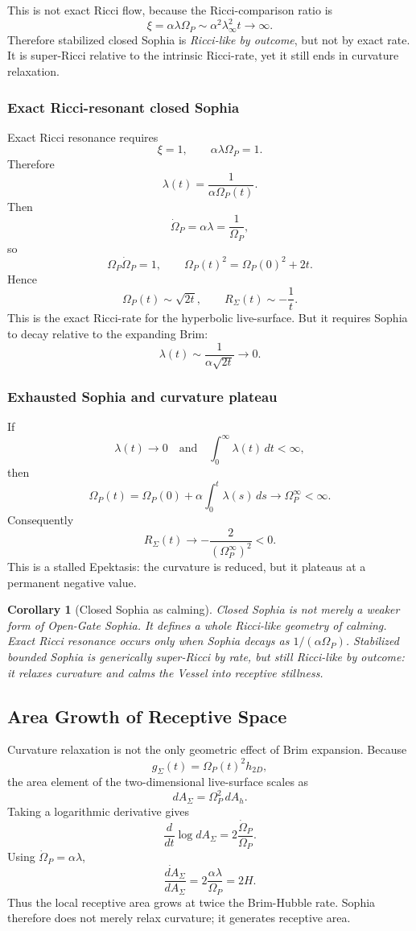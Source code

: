 \documentclass[11pt,a4paper]{article}
\newcommand{\Op}{\Omega_P}
\theoremstyle{plain}
\newtheorem{corollary}{Corollary}
\theoremstyle{remark}
\theoremstyle{definition}
\begin{document}
This is not exact Ricci flow, because the Ricci-comparison ratio is
\[
\xi=\alpha\lambda\Op
\sim
\alpha^2\lambda_\infty^2t\to\infty.
\]
Therefore stabilized closed Sophia is \emph{Ricci-like by outcome}, but not by exact rate. It is
super-Ricci relative to the intrinsic Ricci-rate, yet it still ends in curvature relaxation.

\subsubsection*{Exact Ricci-resonant closed Sophia}
Exact Ricci resonance requires
\[
\xi=1,
\qquad
\alpha\lambda\Op=1.
\]
Therefore
\[
\lambda(t)=\frac{1}{\alpha\Op(t)}.
\]
Then
\[
\dot\Op=\alpha\lambda=\frac{1}{\Op},
\]
so
\[
\Op\dot\Op=1,
\qquad
\Op(t)^2=\Op(0)^2+2t.
\]
Hence
\[
\Op(t)\sim\sqrt{2t},
\qquad
R_\Sigma(t)\sim-\frac{1}{t}.
\]
This is the exact Ricci-rate for the hyperbolic live-surface. But it requires Sophia to decay
relative to the expanding Brim:
\[
\lambda(t)\sim\frac{1}{\alpha\sqrt{2t}}\to0.
\]

\subsubsection*{Exhausted Sophia and curvature plateau}
If
\[
\lambda(t)\to0
\quad\text{and}\quad
\int_0^\infty\lambda(t)\,dt<\infty,
\]
then
\[
\Op(t)=\Op(0)+\alpha\int_0^t\lambda(s)\,ds
\to\Op^\infty<\infty.
\]
Consequently
\[
R_\Sigma(t)\to-\frac{2}{(\Op^\infty)^2}<0.
\]
This is a stalled Epektasis: the curvature is reduced, but it plateaus at a permanent negative
value.

\begin{corollary}[Closed Sophia as calming]
Closed Sophia is not merely a weaker form of Open-Gate Sophia. It defines a whole Ricci-like
geometry of calming. Exact Ricci resonance occurs only when Sophia decays as
\(1/(\alpha\Op)\). Stabilized bounded Sophia is generically super-Ricci by rate, but still
Ricci-like by outcome: it relaxes curvature and calms the Vessel into receptive stillness.
\end{corollary}

\subsection{Area Growth of Receptive Space}\label{sec:area-growth}

Curvature relaxation is not the only geometric effect of Brim expansion. Because
\[
g_\Sigma(t)=\Op(t)^2h_{2D},
\]
the area element of the two-dimensional live-surface scales as
\[
\boxed{dA_\Sigma=\Op^2\,dA_h.}
\]
Taking a logarithmic derivative gives
\[
\frac{d}{dt}\log dA_\Sigma
=
2\frac{\dot\Op}{\Op}.
\]
Using \(\dot\Op=\alpha\lambda\),
\[
\boxed{\frac{\dot{dA}_\Sigma}{dA_\Sigma}
=
2\frac{\alpha\lambda}{\Op}=2H.}
\]
Thus the local receptive area grows at twice the Brim-Hubble rate. Sophia therefore does not
merely relax curvature; it generates receptive area.
\end{document}
